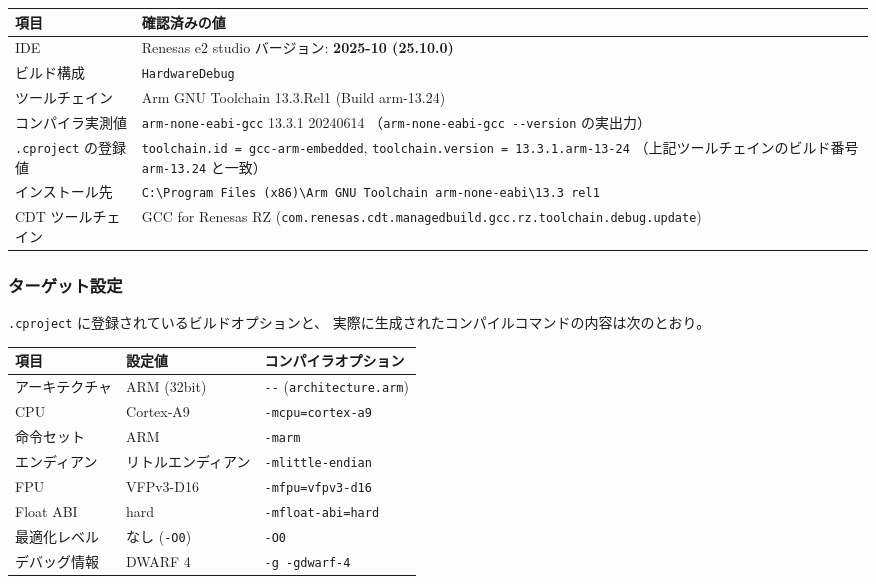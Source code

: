 \documentclass[a4paper,11pt,dvipdfmx]{jsarticle}
\newcommand{\ideversion}{2025-10 (25.10.0)}
\newcommand{\gccbuild}{Arm GNU Toolchain 13.3.Rel1 (Build arm-13.24)}
\newcommand{\gccversion}{13.3.1 20240614}
\begin{document}
\begin{tabularx}{\textwidth}{l X}
\toprule
\textbf{項目} & \textbf{確認済みの値} \\
\midrule
IDE                 & Renesas e2 studio \quad バージョン: \textbf{\ideversion} \\
ビルド構成          & \texttt{HardwareDebug} \\
ツールチェイン      & \gccbuild \\
コンパイラ実測値    & \texttt{arm-none-eabi-gcc} \gccversion \newline
                      （\texttt{arm-none-eabi-gcc -{}-version} の実出力） \\
\texttt{.cproject} の登録値 & \texttt{toolchain.id = gcc-arm-embedded},
                              \texttt{toolchain.version = 13.3.1.arm-13-24}
                              \newline （上記ツールチェインのビルド番号 \texttt{arm-13.24} と一致） \\
インストール先      & \texttt{C:\textbackslash Program Files (x86)\textbackslash Arm GNU Toolchain
                      arm-none-eabi\textbackslash 13.3 rel1} \\
CDT ツールチェイン  & GCC for Renesas RZ
                      (\texttt{com.renesas.cdt.managedbuild.gcc.rz.toolchain.debug.update}) \\
\bottomrule
\end{tabularx}

\subsubsection{ターゲット設定}

\texttt{.cproject} に登録されているビルドオプションと、
実際に生成されたコンパイルコマンドの内容は次のとおり。

\begin{tabularx}{\textwidth}{l l X}
\toprule
\textbf{項目} & \textbf{設定値} & \textbf{コンパイラオプション} \\
\midrule
アーキテクチャ   & ARM (32bit)      & \texttt{-{}-} (\texttt{architecture.arm}) \\
CPU              & Cortex-A9        & \texttt{-mcpu=cortex-a9} \\
命令セット       & ARM              & \texttt{-marm} \\
エンディアン     & リトルエンディアン & \texttt{-mlittle-endian} \\
FPU              & VFPv3-D16        & \texttt{-mfpu=vfpv3-d16} \\
Float ABI        & hard             & \texttt{-mfloat-abi=hard} \\
最適化レベル     & なし (\texttt{-O0}) & \texttt{-O0} \\
デバッグ情報     & DWARF 4          & \texttt{-g -gdwarf-4} \\
\bottomrule
\end{tabularx}
\end{document}
